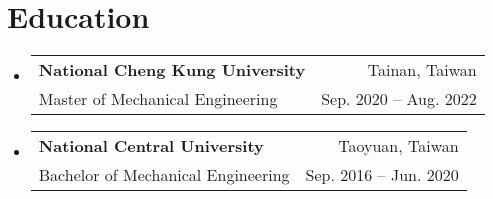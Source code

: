 \documentclass[letterpaper,11pt]{article}
\makeatletter
\newcommand{\resumeSubheading}[4]{
  \vspace{-1pt}\item
    \begin{tabular*}{0.97\textwidth}[t]{l@{\extracolsep{\fill}}r}
      \textbf{#1} & #2 \\
      \small#3 & \small #4 \\
    \end{tabular*}\vspace{-5pt}
}
\newcommand{\resumeSubHeadingListStart}{\begin{itemize}[leftmargin=*]}
\newcommand{\resumeSubHeadingListEnd}{\end{itemize}}
\makeatother
\begin{document}
\section{Education}
  \resumeSubHeadingListStart
    \resumeSubheading
      {National Cheng Kung University}{Tainan, Taiwan}
      {Master of Mechanical Engineering}{Sep. 2020 -- Aug. 2022}
    \resumeSubheading
      {National Central University}{Taoyuan, Taiwan}
      {Bachelor of Mechanical Engineering}{Sep. 2016 -- Jun. 2020}
  \resumeSubHeadingListEnd
\end{document}
